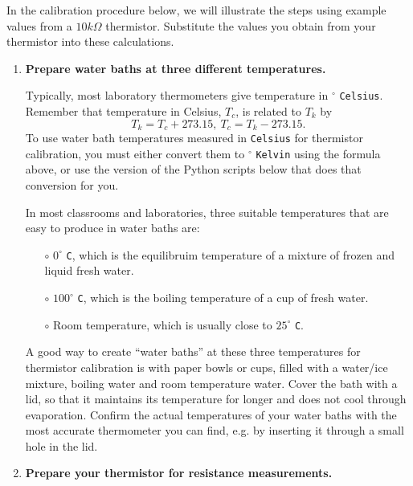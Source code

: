 In the calibration procedure below, we will illustrate the steps using example values from a $10k\Omega$ thermistor. 
Substitute the values you obtain from your thermistor into these calculations.
\begin{enumerate}
	\item \textbf{Prepare water baths at three different temperatures.}
	
	Typically, most laboratory thermometers give temperature in $^\circ$ \texttt{Celsius}.
	Remember that temperature in Celsius, $T_c$, is related to $T_k$ by 
	\begin{equation*}
		T_k = T_c + 273.15, ~T_c = T_k - 273.15.
	\end{equation*}
	To use water bath temperatures measured in \texttt{Celsius} for thermistor calibration, you must either convert them to $^\circ$ \texttt{Kelvin} using the formula above, or use the version of the Python scripts below that does that conversion for you.
	
	\smallskip
	In most classrooms and laboratories, three suitable temperatures that are easy to produce in water baths are:
	\begin{itemize}
		\item[$\circ$] $0^\circ$ \texttt{C}, which is the equilibruim temperature of a mixture of frozen and liquid fresh water. 		
		\item[$\circ$] $100^\circ$ \texttt{C}, which is the boiling temperature of a cup of fresh water. 
		\item[$\circ$] Room temperature, which is usually close to $25^\circ$ \texttt{C}.
	\end{itemize} 

	A good way to create ``water baths'' at these three temperatures for thermistor calibration is with paper bowls or cups, filled with a water/ice mixture, boiling water and room temperature water.
	Cover the bath with a lid, so that it maintains its temperature for longer and does not cool through evaporation. 
	Confirm the actual temperatures of your water baths with the most accurate thermometer you can find, e.g. by inserting it through a small hole in the lid.
	
	\item \textbf{Prepare your thermistor for resistance measurements.}
	

\end{enumerate}

